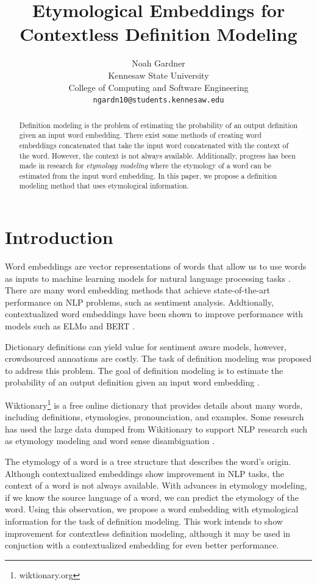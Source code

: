 \documentclass[11pt,a4paper]{article}
\title{Etymological Embeddings for Contextless Definition Modeling}
\author{Noah Gardner \\
  Kennesaw State University \\
  College of Computing and Software Engineering \\
  \texttt{ngardn10@students.kennesaw.edu} \\}
\begin{document}
\maketitle
\begin{abstract}
  Definition modeling is the problem of estimating the probability of an output
  definition given an input word embedding. There exist some methods of creating
  word embeddings concatenated that take the input word concatenated with the
  context of the word. However, the context is not always available.
  Additionally, progress has been made in research for \textit{etymology
    modeling} where the etymology of a word can be estimated from the input word
  embedding. In this paper, we propose a definition modeling method that uses
  etymological information.
\end{abstract}

\section{Introduction}
Word embeddings are vector representations of words that allow us to use words
as inputs to machine learning models for natural language processing tasks
\cite{mikolov_efficient_2013}. There are many word embedding methods that
achieve state-of-the-art performance on NLP problems, such as sentiment
analysis. Addtionally, contextualized word embeddings have been shown to improve
performance with models such as ELMo and BERT \cite{peters_deep_2018,
  devlin_bert_2019}.

Dictionary definitions can yield value for sentiment aware models, however,
crowdsourced annoations are costly. The task of definition modeling was proposed
to address this problem. The goal of definition modeling is to estimate the
probability of an output definition given an input word embedding
\cite{noraset_definition_2016}.

Wiktionary\footnote{wiktionary.org} is a free online dictionary that provides
details about many words, including definitions, etymologies, pronounciation,
and examples. Some research has used the large data dumped from Wikitionary to
support NLP research such as etymology modeling and word sense disambiguation
\cite{wu_computational_2020}.

The etymology of a word is a tree structure that describes the word's origin.
Although contextualized embeddings show improvement in NLP tasks, the context of
a word is not always available. With advances in etymology modeling, if we know
the source language of a word, we can predict the etymology of the word. Using
this observation, we propose a word embedding with etymological information for
the task of definition modeling. This work intends to show improvement for
contextless definition modeling, although it may be used in conjuction with a
contextualized embedding for even better performance.
\end{document}
